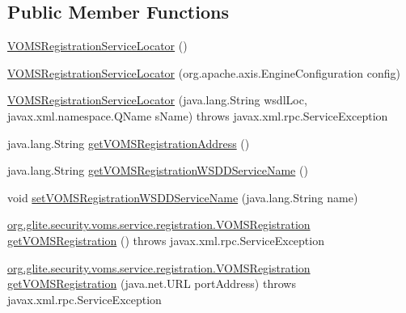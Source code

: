 \subsection*{Public Member Functions}
\begin{DoxyCompactItemize}
\item 
\hyperlink{classorg_1_1glite_1_1security_1_1voms_1_1service_1_1registration_1_1VOMSRegistrationServiceLocator_addf31979358c4e54d4a7d88184e84731}{VOMSRegistrationServiceLocator} ()
\item 
\hyperlink{classorg_1_1glite_1_1security_1_1voms_1_1service_1_1registration_1_1VOMSRegistrationServiceLocator_a84fd1e657e3a15d0aa8203b5002aefac}{VOMSRegistrationServiceLocator} (org.apache.axis.EngineConfiguration config)
\item 
\hyperlink{classorg_1_1glite_1_1security_1_1voms_1_1service_1_1registration_1_1VOMSRegistrationServiceLocator_aee36664ca3d55f369b49d9923c2c2e5d}{VOMSRegistrationServiceLocator} (java.lang.String wsdlLoc, javax.xml.namespace.QName sName)  throws javax.xml.rpc.ServiceException 
\item 
java.lang.String \hyperlink{classorg_1_1glite_1_1security_1_1voms_1_1service_1_1registration_1_1VOMSRegistrationServiceLocator_aff49dcfa180e773dc87a5c559b9e9fed}{getVOMSRegistrationAddress} ()
\item 
java.lang.String \hyperlink{classorg_1_1glite_1_1security_1_1voms_1_1service_1_1registration_1_1VOMSRegistrationServiceLocator_a253149d8117eb6e99fe661b010a39d14}{getVOMSRegistrationWSDDServiceName} ()
\item 
void \hyperlink{classorg_1_1glite_1_1security_1_1voms_1_1service_1_1registration_1_1VOMSRegistrationServiceLocator_a51ec327cdaa76980982ce67d04b0318d}{setVOMSRegistrationWSDDServiceName} (java.lang.String name)
\item 
\hyperlink{interfaceorg_1_1glite_1_1security_1_1voms_1_1service_1_1registration_1_1VOMSRegistration}{org.glite.security.voms.service.registration.VOMSRegistration} \hyperlink{classorg_1_1glite_1_1security_1_1voms_1_1service_1_1registration_1_1VOMSRegistrationServiceLocator_ae0102259b68be98cc8fd174a50b19e4c}{getVOMSRegistration} ()  throws javax.xml.rpc.ServiceException 
\item 
\hyperlink{interfaceorg_1_1glite_1_1security_1_1voms_1_1service_1_1registration_1_1VOMSRegistration}{org.glite.security.voms.service.registration.VOMSRegistration} \hyperlink{classorg_1_1glite_1_1security_1_1voms_1_1service_1_1registration_1_1VOMSRegistrationServiceLocator_a878febd9facfc250a8ee7485322e10ef}{getVOMSRegistration} (java.net.URL portAddress)  throws javax.xml.rpc.ServiceException 

\end{DoxyCompactItemize}
